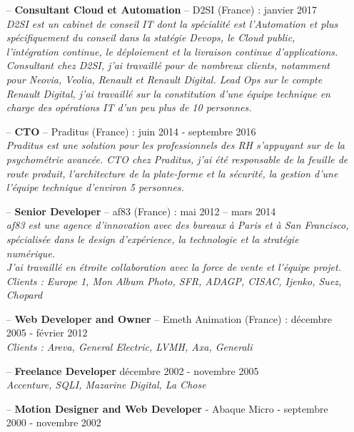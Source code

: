 \documentclass[a4paper,11pt]{article}
\begin{document}
  \begin{itemize}
    \item[--]
      \textbf{Consultant Cloud et Automation} – D2SI (France) : janvier 2017\\
      \textit{D2SI est un cabinet de conseil IT dont la spécialité est l'Automation et plus spécifiquement du conseil dans la statégie Devops, le Cloud public, l'intégration continue, le déploiement et la livraison continue d'applications. Consultant chez D2SI, j'ai travaillé pour de nombreux clients, notamment pour Neovia, Veolia, Renault et Renault Digital. Lead Ops sur le compte Renault Digital, j'ai travaillé sur la constitution d'une équipe technique en charge des opérations IT d'un peu plus de 10 personnes.}
    \item[--]
      \textbf{CTO} – Praditus (France) : juin 2014 - septembre 2016\\
      \textit{Praditus est une solution pour les professionnels des RH s'appuyant sur de la psychométrie avancée. CTO chez Praditus, j'ai été responsable de la feuille de route produit, l'architecture de la plate-forme et la sécurité, la gestion d'une l'équipe technique d'environ 5 personnes.}
    \item[--]
      \textbf{Senior Developer} – af83 (France) : mai 2012 – mars 2014\\
      \textit{af83 est une agence d'innovation avec des bureaux à Paris et à San Francisco, spécialisée dans le design d'expérience, la technologie et la stratégie numérique. \\}
      \textit{J'ai travaillé en étroite collaboration avec la force de vente et l'équipe projet. \\}
      \textit{Clients : Europe 1, Mon Album Photo, SFR, ADAGP, CISAC, Ijenko, Suez, Chopard}
    \item[--]
      \textbf{Web Developer and Owner} – Emeth Animation (France) : décembre 2005 - février 2012\\
      \textit{Clients : Areva, General Electric, LVMH, Axa, Generali}
    \item[--]
      \textbf{Freelance Developer} décembre 2002 - novembre 2005\\
      \textit{Accenture, SQLI, Mazarine Digital, La Chose}
    \item[--]
      \textbf{Motion Designer and Web Developer} - Abaque Micro - septembre 2000 - novembre 2002\\
      \textit{}
  \end{itemize}
\end{document}
